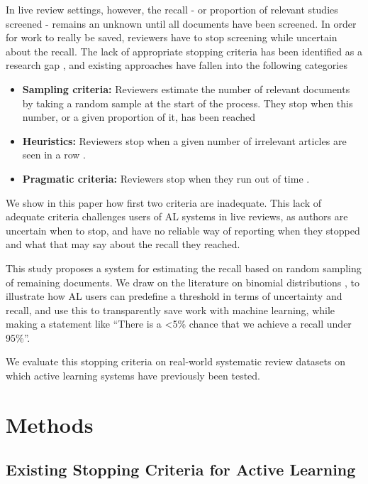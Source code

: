 \documentclass{bmcart}
\begin{document}
	In live review settings, however, the recall - or proportion of relevant studies screened - remains an unknown until all documents have been screened. In order for work to really be saved, reviewers have to stop screening while uncertain about the recall. The lack of appropriate stopping criteria has been identified as a research gap \cite{bannach-brown2019}, and existing approaches have fallen into the following categories
	\begin{itemize}
		\item \textbf{Sampling criteria:} Reviewers estimate the number of relevant documents by taking a random sample at the start of the process. They stop when this number, or a given proportion of it, has been reached \cite{Shemilt2014}
		\item \textbf{Heuristics:} Reviewers stop when a given number of irrelevant articles are seen in a row \cite{Przybya2018}. 
		\item \textbf{Pragmatic criteria:} Reviewers stop when they run out of time \cite{miwa2014}. 
	\end{itemize}
	
	We show in this paper how first two criteria are inadequate.
	This lack of adequate criteria challenges users of AL systems in live reviews, as authors are uncertain when to stop, and have no reliable way of reporting when they stopped and what that may say about the recall they reached. 
	
	This study proposes a system for estimating the recall based on random sampling of remaining documents. We draw on the literature on binomial distributions \cite{Brown2001}, to illustrate how AL users can predefine a threshold in terms of uncertainty and recall, and use this to transparently save work with machine learning, while making a statement like ``There is a <5\% chance that we achieve a recall under 95\%''.
	
	We evaluate this stopping criteria on real-world systematic review datasets on which active learning systems have previously been tested.
	
	\section*{Methods}
	
	\subsection*{Existing Stopping Criteria for Active Learning}
	
\end{document}
